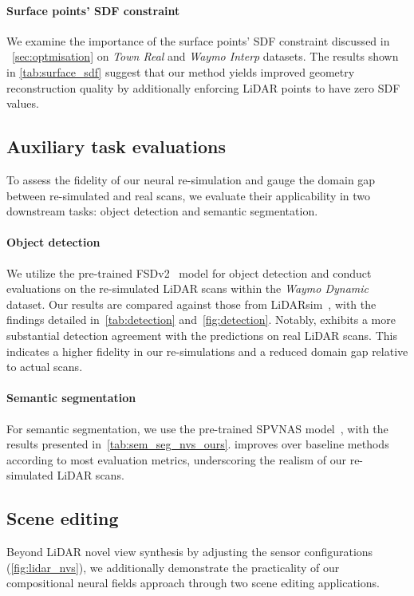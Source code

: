 \paragraph{Surface points' SDF constraint}
We examine the importance of the surface points' SDF constraint discussed in ~\cref{sec:optmisation} on \textit{Town Real} and \textit{Waymo Interp} datasets. The results shown in \cref{tab:surface_sdf} suggest that our method yields improved geometry reconstruction quality by additionally enforcing LiDAR points to have zero SDF values. 


\subsection{Auxiliary task evaluations} 
\label{sec:downstream}
To assess the fidelity of our neural re-simulation and gauge the domain gap between re-simulated and real scans, we evaluate their applicability in two downstream tasks: object detection and semantic segmentation.


\paragraph{Object detection}
We utilize the pre-trained FSDv2~\cite{fan2023fsdv2} model for object detection and conduct evaluations on the re-simulated LiDAR scans within the \textit{Waymo Dynamic} dataset. Our results are compared against those from LiDARsim~\cite{manivasagam2020lidarsim}, with the findings detailed in~\cref{tab:detection} and~\cref{fig:detection}. Notably, \dynfl exhibits a more substantial detection agreement with the predictions on real LiDAR scans. This indicates a higher fidelity in our re-simulations and a reduced domain gap relative to actual scans.




\paragraph{Semantic segmentation}
For semantic segmentation, we use the pre-trained SPVNAS model~\cite{tang2020searching}, with the results presented in~\cref{tab:sem_seg_nvs_ours}. \dynfl improves over baseline methods according to most evaluation metrics, underscoring the realism of our re-simulated LiDAR scans.



\subsection{Scene editing}
Beyond LiDAR novel view synthesis by adjusting the sensor configurations (\cf \cref{fig:lidar_nvs}), we additionally demonstrate the practicality of our compositional neural fields approach through two scene editing applications.


